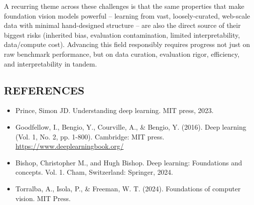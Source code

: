 \documentclass[12pt,a4paper]{article}
\begin{document}
\begin{keyidea}
A recurring theme across these challenges is that the same properties that make foundation vision models powerful -- learning from vast, loosely-curated, web-scale data with minimal hand-designed structure -- are also the direct source of their biggest risks (inherited bias, evaluation contamination, limited interpretability, data/compute cost). Advancing this field responsibly requires progress not just on raw benchmark performance, but on data curation, evaluation rigor, efficiency, and interpretability in tandem.
\end{keyidea}

\subsection*{REFERENCES}
\begin{itemize}
    \item Prince, Simon JD. Understanding deep learning. MIT press, 2023.
    \item Goodfellow, I., Bengio, Y., Courville, A., \& Bengio, Y. (2016). Deep learning (Vol. 1, No. 2, pp. 1-800). Cambridge: MIT press. \url{https://www.deeplearningbook.org/}
    \item Bishop, Christopher M., and Hugh Bishop. Deep learning: Foundations and concepts. Vol. 1. Cham, Switzerland: Springer, 2024.
    \item Torralba, A., Isola, P., \& Freeman, W. T. (2024). Foundations of computer vision. MIT Press.
\end{itemize}
\end{document}
